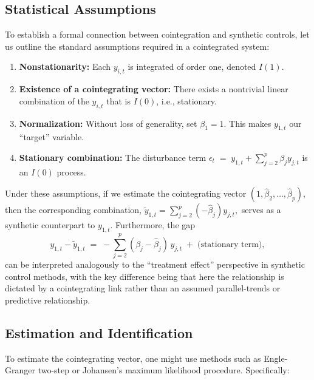 \subsection{Statistical Assumptions}

To establish a formal connection between cointegration and synthetic controls, let us outline the standard assumptions required in a cointegrated system:

\begin{enumerate}
    \item \textbf{Nonstationarity:} Each $y_{i,t}$ is integrated of order one, denoted $I(1)$.
    \item \textbf{Existence of a cointegrating vector:} There exists a nontrivial linear combination of the $y_{i,t}$ that is $I(0)$, i.e., stationary.
    \item \textbf{Normalization:} Without loss of generality, set $\beta_1 = 1$. This makes $y_{1,t}$ our ``target'' variable.
    \item \textbf{Stationary combination:} The disturbance term
    $
    \epsilon_t \;=\; y_{1,t} + \sum_{j=2}^{p} \beta_j y_{j,t}
    $
    is an $I(0)$ process.
\end{enumerate}


Under these assumptions, if we estimate the cointegrating vector $(1, \widehat{\beta}_2, \ldots, \widehat{\beta}_p)$, then the corresponding combination,
$
    \widetilde{y}_{1,t} = \sum_{j=2}^{p} \left(-\widehat{\beta}_j\right) y_{j,t},
$
serves as a synthetic counterpart to $y_{1,t}$. Furthermore, the gap
\begin{equation*}
    y_{1,t} - \widetilde{y}_{1,t} 
    \;=\; -\sum_{j=2}^{p} \left(\beta_j - \widehat{\beta}_j \right) \, y_{j,t} \;+\;\text{(stationary term)},
\end{equation*}
can be interpreted analogously to the ``treatment effect'' perspective in synthetic control methods, with the key difference being that here the relationship is dictated by a cointegrating link rather than an assumed parallel-trends or predictive relationship.



\subsection{Estimation and Identification}

To estimate the cointegrating vector, one might use methods such as Engle-Granger two-step or Johansen's maximum likelihood procedure. Specifically:


